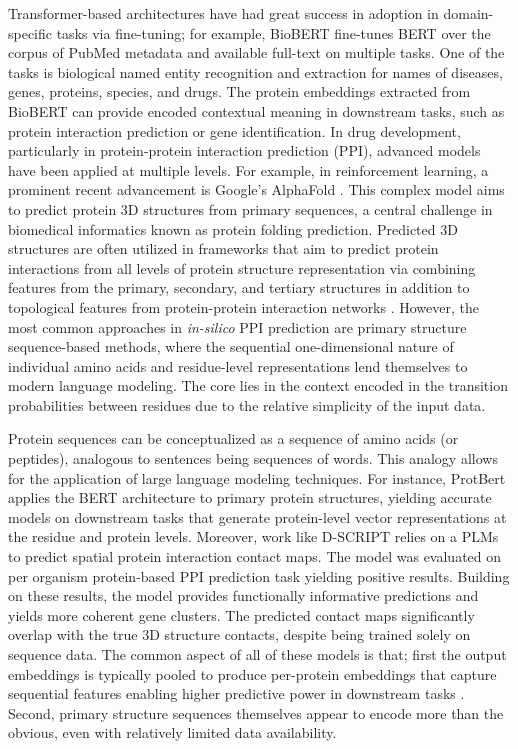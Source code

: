 \documentclass[utf8]{article}
\begin{document}
	Transformer-based architectures have had great success in adoption in domain-specific tasks via fine-tuning; for example, BioBERT \cite{lee_biobertpretrainedbiomedical_2020} fine-tunes BERT over the corpus of PubMed metadata and available full-text on multiple tasks. One of the tasks is biological named entity recognition and extraction for names of diseases, genes, proteins, species, and drugs. The protein embeddings extracted from BioBERT can provide encoded contextual meaning in downstream tasks, such as protein interaction prediction or gene identification. In drug development, particularly in protein-protein interaction prediction (PPI), advanced models have been applied at multiple levels. For example, in reinforcement learning, a prominent recent advancement is Google’s AlphaFold \cite{jumper_highlyaccurateprotein_2021}. This complex model aims to predict protein 3D structures from primary sequences, a central challenge in biomedical informatics known as protein folding prediction. Predicted 3D structures are often utilized in frameworks that aim to predict protein interactions from all levels of protein structure representation via combining features from the primary, secondary, and tertiary structures in addition to topological features from protein-protein interaction networks \cite{zhou_graphneuralnetwork_2022} \cite{jha_predictionproteinprotein_2022}. However, the most common approaches in \textit{in-silico} PPI prediction are primary structure sequence-based methods, where the sequential one-dimensional nature of individual amino acids and residue-level representations lend themselves to modern language modeling. The core lies in the context encoded in the transition probabilities between residues due to the relative simplicity of the input data.
	
	Protein sequences can be conceptualized as a sequence of amino acids (or peptides), analogous to sentences being sequences of words. This analogy allows for the application of large language modeling techniques. For instance, ProtBert \cite{elnaggar_prottransunderstandinglanguage_2022} applies the BERT architecture \cite{devlin_bertpretrainingdeep_2019} to primary protein structures, yielding accurate models on downstream tasks that generate protein-level vector representations at the residue and protein levels. Moreover, work like \cite{sledzieski_dscripttranslatesgenome_2021} D-SCRIPT relies on a PLMs to predict spatial protein interaction contact maps. The model was evaluated on per organism protein-based PPI prediction task yielding positive results. Building on these results, the model provides functionally informative predictions and yields more coherent gene clusters. The predicted contact maps significantly overlap with the true 3D structure contacts, despite being trained solely on sequence data. The common aspect of all of these models is that; first the output embeddings is typically pooled to produce per-protein embeddings that capture sequential features enabling higher predictive power in downstream tasks \cite{elnaggar_prottransunderstandinglanguage_2022}. Second, primary structure sequences themselves appear to encode more than the obvious, even with relatively limited data availability.
	
\end{document}
